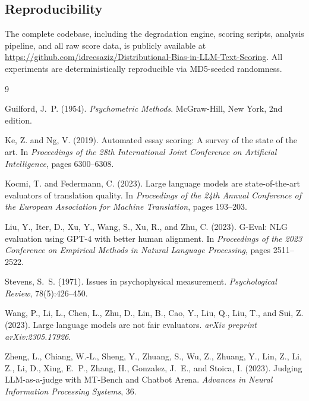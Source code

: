 \documentclass[11pt]{article}
\begin{document}
\subsection*{Reproducibility}

The complete codebase, including the degradation engine, scoring scripts, analysis pipeline, and all raw score data, is publicly available at \url{https://github.com/idreesaziz/Distributional-Bias-in-LLM-Text-Scoring}. All experiments are deterministically reproducible via MD5-seeded randomness.

\begin{thebibliography}{9}

Guilford, J.~P. (1954).
\newblock \emph{Psychometric Methods}.
\newblock McGraw-Hill, New York, 2nd edition.

Ke, Z. and Ng, V. (2019).
\newblock Automated essay scoring: A survey of the state of the art.
\newblock In \emph{Proceedings of the 28th International Joint Conference on Artificial Intelligence}, pages 6300--6308.

Kocmi, T. and Federmann, C. (2023).
\newblock Large language models are state-of-the-art evaluators of translation quality.
\newblock In \emph{Proceedings of the 24th Annual Conference of the European Association for Machine Translation}, pages 193--203.

Liu, Y., Iter, D., Xu, Y., Wang, S., Xu, R., and Zhu, C. (2023).
\newblock G-Eval: {NLG} evaluation using {GPT-4} with better human alignment.
\newblock In \emph{Proceedings of the 2023 Conference on Empirical Methods in Natural Language Processing}, pages 2511--2522.

Stevens, S.~S. (1971).
\newblock Issues in psychophysical measurement.
\newblock \emph{Psychological Review}, 78(5):426--450.

Wang, P., Li, L., Chen, L., Zhu, D., Lin, B., Cao, Y., Liu, Q., Liu, T., and Sui, Z. (2023).
\newblock Large language models are not fair evaluators.
\newblock \emph{arXiv preprint arXiv:2305.17926}.

Zheng, L., Chiang, W.-L., Sheng, Y., Zhuang, S., Wu, Z., Zhuang, Y., Lin, Z., Li, Z., Li, D., Xing, E.~P., Zhang, H., Gonzalez, J.~E., and Stoica, I. (2023).
\newblock Judging {LLM}-as-a-judge with {MT-Bench} and {Chatbot Arena}.
\newblock \emph{Advances in Neural Information Processing Systems}, 36.

\end{thebibliography}
\end{document}
